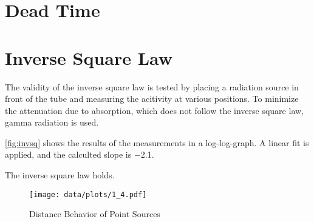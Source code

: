 \section{Dead Time}

\section{Inverse Square Law}
The validity of the inverse square law is tested by placing a radiation source in front of the tube and measuring the acitivity at various positions.
To minimize the attenuation due to absorption, which does not follow the inverse square law, gamma radiation is used.

\autoref{fig:invsq} shows the results of the measurements in a log-log-graph.
A linear fit is applied, and the calculted slope is \num{-2.1}.

The inverse square law holds.

\begin{figure}[tb]
	\centering
	\texttt{[image: data/plots/1\_4.pdf]}
	\caption{Distance Behavior of Point Sources}
	\label{fig:invsq}
\end{figure}
